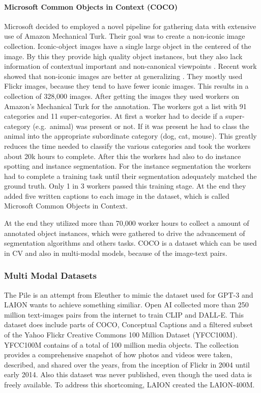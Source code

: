 \documentclass[
]{krantz}
\begin{document}
\hypertarget{microsoft-common-objects-in-context-coco}{%
\paragraph{Microsoft Common Objects in Context (COCO)}\label{microsoft-common-objects-in-context-coco}}

Microsoft decided to employed a novel pipeline for gathering data with extensive use of Amazon Mechanical Turk. Their goal was to create a non-iconic image collection. Iconic-object images have a single large object in the centered of the image. By this they provide high quality object instances, but they also lack information of contextual important and non-canonical viewpoints \citep{lin2014microsoft}. Recent work showed that non-iconic images are better at generalizing \citep{torralba2011unbiased}. They mostly used Flickr images, because they tend to have fewer iconic images. This results in a collection of 328,000 images. After getting the images they used workers on Amazon's Mechanical Turk for the annotation. The workers got a list with 91 categories and 11 super-categories. At first a worker had to decide if a super-category (e.g.~animal) was present or not. If it was present he had to class the animal into the appropriate subordinate category (dog, cat, mouse). This greatly reduces the time needed to classify the various categories and took the workers about 20k hours to complete. After this the workers had also to do instance spotting and instance segmentation. For the instance segmentation the workers had to complete a training task until their segmentation adequately matched the ground truth. Only 1 in 3 workers passed this training stage. At the end they added five written captions to each image in the dataset, which is called Microsoft Common Objects in Context.

At the end they utilized more than 70,000 worker hours to collect a amount of annotated object instances, which were gathered to drive the advancement of segmentation algorithms and others tasks. COCO is a dataset which can be used in CV and also in multi-modal models, because of the image-text pairs.

\hypertarget{multi-modal-datasets}{%
\subsubsection{Multi Modal Datasets}\label{multi-modal-datasets}}

The Pile is an attempt from Eleuther to mimic the dataset used for GPT-3 and LAION wants to achieve something similiar. Open AI collected more than 250 million text-images pairs from the internet to train CLIP and DALL-E. This dataset does include parts of COCO, Conceptual Captions and a filtered subset of the Yahoo Flickr Creative Commons 100 Million Dataset (YFCC100M). YFCC100M contains of a total of 100 million media objects. The collection provides a comprehensive snapshot of how photos and videos were taken, described, and shared over the years, from the inception of Flickr in 2004 until early 2014. Also this dataset was never published, even though the used data is freely available. To address this shortcoming, LAION created the LAION-400M.
\end{document}

